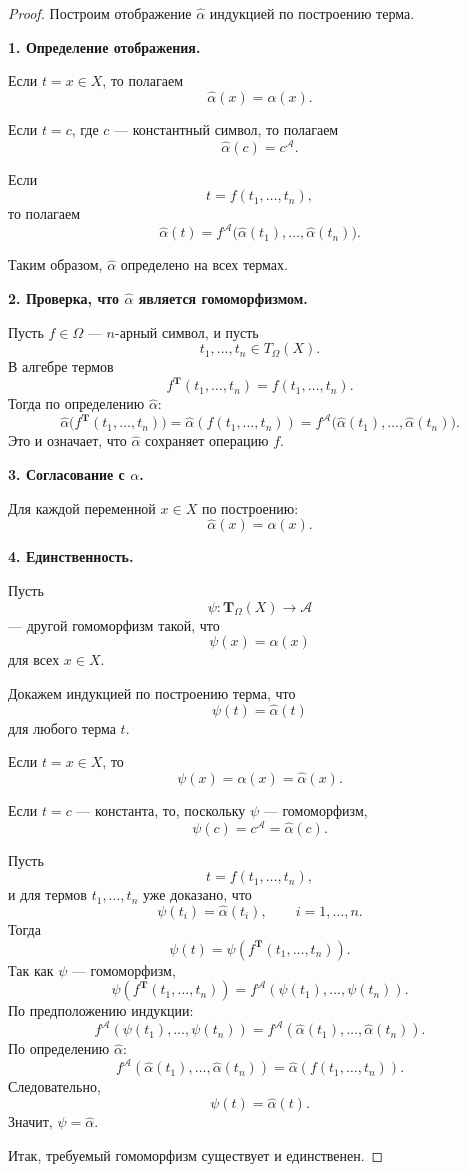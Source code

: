 \documentclass[12pt,a4paper]{article}
\begin{document}
\begin{proof}
Построим отображение $\widehat{\alpha}$ индукцией по построению терма.

\textbf{1. Определение отображения.}

Если $t=x\in X$, то полагаем
\[
\widehat{\alpha}(x)=\alpha(x).
\]

Если $t=c$, где $c$ --- константный символ, то полагаем
\[
\widehat{\alpha}(c)=c^{\mathcal A}.
\]

Если
\[
t=f(t_1,\dots,t_n),
\]
то полагаем
\[
\widehat{\alpha}(t)
=
f^{\mathcal A}
\bigl(
\widehat{\alpha}(t_1),\dots,\widehat{\alpha}(t_n)
\bigr).
\]

Таким образом, $\widehat{\alpha}$ определено на всех термах.

\textbf{2. Проверка, что $\widehat{\alpha}$ является гомоморфизмом.}

Пусть $f\in\Omega$ --- $n$-арный символ, и пусть
\[
t_1,\dots,t_n\in T_\Omega(X).
\]
В алгебре термов
\[
f^{\mathbf T}(t_1,\dots,t_n)=f(t_1,\dots,t_n).
\]
Тогда по определению $\widehat{\alpha}$:
\[
\widehat{\alpha}
\bigl(
f^{\mathbf T}(t_1,\dots,t_n)
\bigr)
=
\widehat{\alpha}(f(t_1,\dots,t_n))
=
f^{\mathcal A}
\bigl(
\widehat{\alpha}(t_1),\dots,\widehat{\alpha}(t_n)
\bigr).
\]
Это и означает, что $\widehat{\alpha}$ сохраняет операцию $f$.

\textbf{3. Согласование с $\alpha$.}

Для каждой переменной $x\in X$ по построению:
\[
\widehat{\alpha}(x)=\alpha(x).
\]

\textbf{4. Единственность.}

Пусть
\[
\psi\colon \mathbf T_\Omega(X)\to \mathcal A
\]
--- другой гомоморфизм такой, что
\[
\psi(x)=\alpha(x)
\]
для всех $x\in X$.

Докажем индукцией по построению терма, что
\[
\psi(t)=\widehat{\alpha}(t)
\]
для любого терма $t$.

Если $t=x\in X$, то
\[
\psi(x)=\alpha(x)=\widehat{\alpha}(x).
\]

Если $t=c$ --- константа, то, поскольку $\psi$ --- гомоморфизм,
\[
\psi(c)=c^{\mathcal A}=\widehat{\alpha}(c).
\]

Пусть
\[
t=f(t_1,\dots,t_n),
\]
и для термов $t_1,\dots,t_n$ уже доказано, что
\[
\psi(t_i)=\widehat{\alpha}(t_i),
\qquad i=1,\dots,n.
\]
Тогда
\[
\psi(t)
=
\psi(f^{\mathbf T}(t_1,\dots,t_n)).
\]
Так как $\psi$ --- гомоморфизм,
\[
\psi(f^{\mathbf T}(t_1,\dots,t_n))
=
f^{\mathcal A}(\psi(t_1),\dots,\psi(t_n)).
\]
По предположению индукции:
\[
f^{\mathcal A}(\psi(t_1),\dots,\psi(t_n))
=
f^{\mathcal A}(\widehat{\alpha}(t_1),\dots,\widehat{\alpha}(t_n)).
\]
По определению $\widehat{\alpha}$:
\[
f^{\mathcal A}(\widehat{\alpha}(t_1),\dots,\widehat{\alpha}(t_n))
=
\widehat{\alpha}(f(t_1,\dots,t_n)).
\]
Следовательно,
\[
\psi(t)=\widehat{\alpha}(t).
\]
Значит, $\psi=\widehat{\alpha}$.

Итак, требуемый гомоморфизм существует и единственен.
\end{proof}
\end{document}
